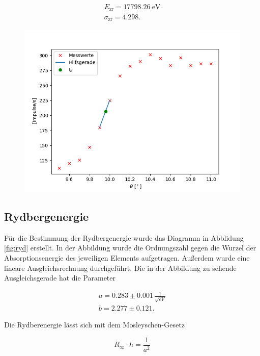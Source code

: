 \begin{align*}
    E_\text{zr} = \SI{17798.26}{\electronvolt}\\
    \sigma_\text{zr} = 4.298.
\end{align*}

\begin{figure}
    \centering
    \includegraphics{zr.png}
    \label{fig:zr}
\end{figure}

\subsection{Rydbergenergie}

Für die Bestimmung der Rydbergenergie wurde das Diagramm in Abblidung \ref{fig:ryd} erstellt. In der Abbildung wurde die Ordnungszahl gegen die Wurzel der Absorptionsenergie des jeweiligen Elements aufgetragen. Außerdem wurde eine lineare Ausgleichsrechnung durchgeführt. Die in der Abbildung zu sehende Ausgleichsgerade hat die Parameter 

\begin{align*}
    a = 0.283 \pm 0.001 \, \frac{1}{\sqrt{eV}} \\
    b = 2.277 \pm 0.121.
\end{align*}

Die Rydberenergie lässt sich mit dem Mosleyschen-Gesetz

\begin{equation*}
    R_\infty \cdot h = \frac{1}{a^2}
\end{equation*}

